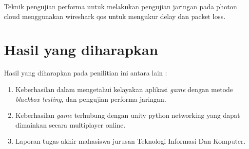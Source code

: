 Teknik pengujian performa untuk melakukan pengujian jaringan pada photon cloud menggunakan wireshark qos untuk mengukur delay dan packet loss.
\section{Hasil yang diharapkan}
Hasil yang diharapkan pada penilitian ini antara lain :
\begin{enumerate}
    \item Keberhasilan dalam mengetahui kelayakan aplikasi \textit{game} dengan metode \textit{blackbox testing}, dan pengujian performa jaringan.
    \item Keberhasilan \textit{game} terhubung dengan unity python networking yang dapat dimainkan secara multiplayer online.
    \item Laporan tugas akhir mahasiswa jurusan Teknologi Informasi Dan Komputer.
\end{enumerate}